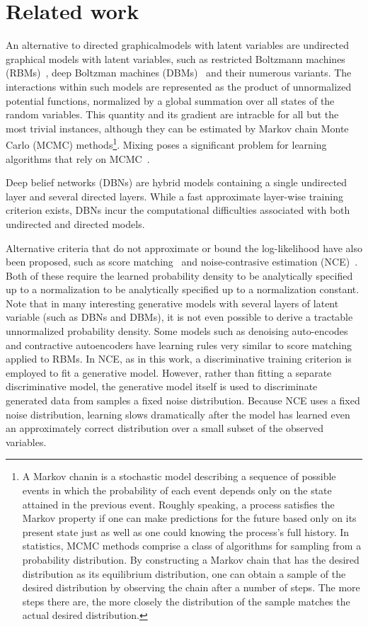 \documentclass[10pt,twocolumn,letterpaper]{article}
\begin{document}
\section{Related work}
\par An alternative to directed graphicalmodels with latent variables are undirected graphical models with latent variables, such as restricted Boltzmann machines (RBMs)~\cite{smolensky1986information}, deep Boltzman machines (DBMs)~\cite{salakhutdinov2010efficient} and their numerous variants. The interactions within such models are represented as the product of unnormalized potential functions, normalized by a global summation over all states of the random variables. This quantity and its gradient are intracble for all but the most trivial instances, although they can be estimated by Markov chain Monte Carlo (MCMC) methods\footnote{A Markov chanin is a stochastic model describing a sequence of possible events in which the probability of each event depends only on the state attained in the previous event. Roughly speaking, a process satisfies the Markov property if one can make predictions for the future based only on its present state just as well as one could knowing the process's full history. In statistics, MCMC methods comprise a class of algorithms for sampling from a probability distribution. By constructing a Markov chain that has the desired distribution as its equilibrium distribution, one can obtain a sample of the desired distribution by observing the chain after a number of steps. The more steps there are, the more closely the distribution of the sample matches the actual desired distribution.}. Mixing poses a significant problem for learning algorithms that rely on MCMC~\cite{bengio2013better}.
\par Deep belief networks (DBNs) are hybrid models containing a single undirected layer and several directed layers. While a fast approximate layer-wise training criterion exists, DBNs incur the computational difficulties associated with both undirected and directed models.
\par Alternative criteria that do not approximate or bound the log-likelihood have also been proposed, such as score matching~\cite{Hyv2005Estimation} and noise-contrasive estimation (NCE)~\cite{Gutmann2010Noise}. Both of these require the learned probability density to be analytically specified up to a normalization to be analytically specified up to a normalization constant. Note that in many interesting generative models with several layers of latent variable (such as DBNs and DBMs), it is not even possible to derive a tractable unnormalized probability density. Some models such as denoising auto-encodes~\cite{Vincent2008Extracting} and contractive autoencoders have learning rules very similar to score matching applied to RBMs. In NCE, as in this work, a discriminative training criterion is employed to fit a generative model. However, rather than fitting a separate discriminative model, the generative model itself  is used to discriminate generated data from samples a fixed noise distribution. Because NCE uses a fixed noise distribution, learning slows dramatically after the model has learned even an approximately correct distribution over a small subset of the observed variables. 
\end{document}
